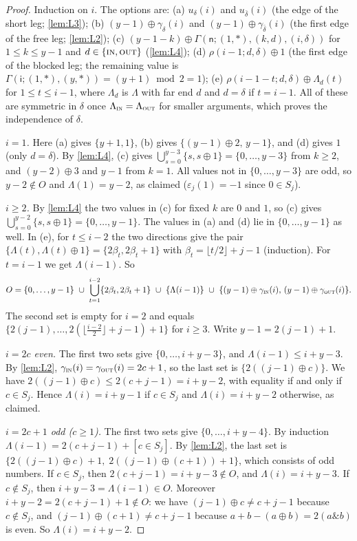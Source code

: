 \documentclass[11pt]{amsart}
\theoremstyle{definition}
\theoremstyle{remark}
\newcommand{\sn}{\mathsf{n}}
\newcommand{\si}{\mathsf{i}}
\newcommand{\free}{\ast}
\newcommand{\IN}{\textup{\textsc{in}}}
\newcommand{\OUT}{\textup{\textsc{out}}}
\begin{document}
\begin{proof}
Induction on $i$. The options are:
(a) $u_\delta(i)$ and $u_{\bar\delta}(i)$ (the edge of the short leg; \cref{lem:L3});
(b) $(y-1)\oplus\gamma_\delta(i)$ and $(y-1)\oplus\gamma_{\bar\delta}(i)$ (the first edge of the free leg; \cref{lem:L2});
(c) $(y-1-k)\oplus\Gamma(\sn;(1,\free),(k,d),(i,\delta))$ for $1\le k\le y-1$ and $d\in\{\IN,\OUT\}$ (\cref{lem:L4});
(d) $\rho(i-1;d,\delta)\oplus1$ (the first edge of the blocked leg; the remaining value is $\Gamma(\si;(1,\free),(y,\free))=(y+1)\bmod 2=1$);
(e) $\rho(i-1-t;d,\delta)\oplus \Lambda_d(t)$ for $1\le t\le i-1$, where $\Lambda_d$ is $\Lambda$ with far end $d$ and $d=\delta$ if $t=i-1$.
All of these are symmetric in $\delta$ once $\Lambda_\IN=\Lambda_\OUT$ for smaller arguments, which proves the independence of $\delta$.

\emph{$i=1$.} Here (a) gives $\{y+1,1\}$, (b) gives $\{(y-1)\oplus2,\,y-1\}$, and (d) gives $1$ (only $d=\delta$). By \cref{lem:L4}, (c) gives $\bigcup_{s=0}^{y-3}\{s,s\oplus1\}=\{0,\dots,y-3\}$ from $k\ge2$, and $(y-2)\oplus3$ and $y-1$ from $k=1$. All values not in $\{0,\dots,y-3\}$ are odd, so $y-2\notin O$ and $\Lambda(1)=y-2$, as claimed ($\varepsilon_j(1)=-1$ since $0\in S_j$).

\emph{$i\ge2$.} By \cref{lem:L4} the two values in (c) for fixed $k$ are $0$ and $1$, so (c) gives $\bigcup_{s=0}^{y-2}\{s,s\oplus1\}=\{0,\dots,y-1\}$. The values in (a) and (d) lie in $\{0,\dots,y-1\}$ as well. In (e), for $t\le i-2$ the two directions give the pair $\{\Lambda(t),\Lambda(t)\oplus1\}=\{2\beta_t,2\beta_t+1\}$ with $\beta_t=\lfloor t/2\rfloor+j-1$ (induction). For $t=i-1$ we get $\Lambda(i-1)$. So
\[
O=\{0,\dots,y-1\}\ \cup\ \bigcup_{t=1}^{i-2}\{2\beta_t,2\beta_t+1\}\ \cup\ \{\Lambda(i-1)\}\ \cup\ \{(y-1)\oplus\gamma_\IN(i),\,(y-1)\oplus\gamma_\OUT(i)\}.
\]
The second set is empty for $i=2$ and equals $\{2(j-1),\dots,2(\lfloor\tfrac{i-2}{2}\rfloor+j-1)+1\}$ for $i\ge3$. Write $y-1=2(j-1)+1$.

\emph{$i=2c$ even.} The first two sets give $\{0,\dots,i+y-3\}$, and $\Lambda(i-1)\le i+y-3$. By \cref{lem:L2}, $\gamma_\IN(i)=\gamma_\OUT(i)=2c+1$, so the last set is $\{2((j-1)\oplus c)\}$. We have $2((j-1)\oplus c)\le 2(c+j-1)=i+y-2$, with equality if and only if $c\in S_j$. Hence $\Lambda(i)=i+y-1$ if $c\in S_j$ and $\Lambda(i)=i+y-2$ otherwise, as claimed.

\emph{$i=2c+1$ odd ($c\ge1$).} The first two sets give $\{0,\dots,i+y-4\}$. By induction $\Lambda(i-1)=2(c+j-1)+[c\in S_j]$. By \cref{lem:L2}, the last set is $\{2((j-1)\oplus c)+1,\;2((j-1)\oplus(c+1))+1\}$, which consists of odd numbers. If $c\in S_j$, then $2(c+j-1)=i+y-3\notin O$, and $\Lambda(i)=i+y-3$. If $c\notin S_j$, then $i+y-3=\Lambda(i-1)\in O$. Moreover $i+y-2=2(c+j-1)+1\notin O$: we have $(j-1)\oplus c\ne c+j-1$ because $c\notin S_j$, and $(j-1)\oplus(c+1)\ne c+j-1$ because $a+b-(a\oplus b)=2(a\mathbin{\&}b)$ is even. So $\Lambda(i)=i+y-2$.
\end{proof}
\end{document}
